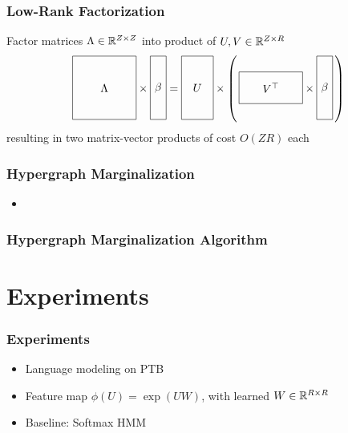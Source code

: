 \documentclass{beamer}
\begin{document}
\begin{frame}
\frametitle{Low-Rank Factorization}
Factor matrices $\Lambda\in\mathbb{R}^{Z\times Z}$ into product of $U,V\in\mathbb{R}^{Z \times R}$
\[
\vcenter{\hbox{\begin{tikzpicture}[baseline=-0.5ex]
    \draw (0,0) rectangle (2,2) node[pos=.5] {$\Lambda$};
\end{tikzpicture}}}
\times
\vcenter{\hbox{\begin{tikzpicture}[baseline=-0.5ex]
    \draw (0,0) rectangle (.5,2) node[pos=.5] {$\beta$};
\end{tikzpicture}}}
=
\vcenter{\hbox{\begin{tikzpicture}[baseline=-0.5ex]
    \draw (0,0) rectangle (1,2) node[pos=.5] {$U$};
\end{tikzpicture}}}
\times
\left(\,
\vcenter{\hbox{\begin{tikzpicture}[baseline=-0.5ex]
    \draw (0,0) rectangle (2,1) node[pos=.5] {$V^\top$};
\end{tikzpicture}}}
\times
\vcenter{\hbox{\begin{tikzpicture}[baseline=-0.5ex]
    \draw (0,0) rectangle (.5,2) node[pos=.5] {$\beta$};
\end{tikzpicture}}}
\,\right)
\]
resulting in two matrix-vector products of cost $O(ZR)$ each
\end{frame}

\begin{frame}
\frametitle{Hypergraph Marginalization}
\begin{itemize}
\item 
\end{itemize}
\end{frame}

\begin{frame}
\frametitle{Hypergraph Marginalization Algorithm}

\end{frame}


\section{Experiments}

\begin{frame}
\frametitle{Experiments}
\begin{itemize}
\item Language modeling on PTB
\vspace{2em}
\item Feature map $\phi(U) = \exp\left(U W\right)$,
with learned $W\in\mathbb{R}^{R \times R}$
\vspace{2em}
\item Baseline: Softmax HMM
\end{itemize}
\end{frame}
\end{document}
